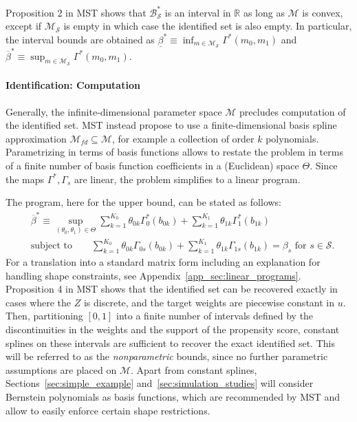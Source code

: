 \documentclass[12pt,a4paper,english]{article} %
\numberwithin{equation}{section}
\theoremstyle{definition}
\theoremstyle{remark}
\theoremstyle{plain}
\begin{document}
Proposition 2 in MST shows that $\mathcal{B}_\mathcal{S}^*$ is an interval in $\mathbb{R}$ as long as $\mathcal{M}$ is convex, except if $\mathcal{M}_\mathcal{S}$ is empty in which case the identified set is also empty.
In particular, the interval bounds are obtained as $\underline{\beta}^* \equiv \inf_{m\in\mathcal{M}_\mathcal{S}}\Gamma^*(m_0, m_1)$ and $\overline{\beta}^* \equiv \sup_{m\in\mathcal{M}_\mathcal{S}}\Gamma^*(m_0, m_1)$.


\paragraph{Identification: Computation}
Generally, the infinite-dimensional parameter space $\mathcal{M}$ precludes computation of the identified set.
MST instead propose to use a finite-dimensional basis spline approximation $\mathcal{M}_{fd}\subseteq{\mathcal{M}}$, for example a collection of order $k$ polynomials.
Parametrizing in terms of basis functions allows to restate the problem in terms of a finite number of basis function coefficients in a (Euclidean) space $\Theta$.
Since the maps $\Gamma^*, \Gamma_s$ are linear, the problem simplifies to a linear program.

The program, here for the upper bound, can be stated as follows:
\begin{align}\label{eq:lp_identification}
  &\overline{\beta}^* \equiv \sup_{(\theta_0, \theta_1)\in\Theta} \sum_{k=1}^{K_0}\theta_{0k}\Gamma^*_0(b_{0k}) + \sum_{k=1}^{K_1}\theta_{1k}\Gamma^*_1(b_{1k}) \\
  &\text{subject to} \qquad \sum_{k=1}^{K_0}\theta_{0k}\Gamma_{0s}(b_{0k}) + \sum_{k=1}^{K_1}\theta_{1k}\Gamma_{1s}(b_{1k}) = \beta_s \text{ for } s \in \mathcal{S}.
\end{align}
For a translation into a standard matrix form including an explanation for handling shape constraints, see Appendix~\ref{app_sec:linear_programs}.
Proposition 4 in MST shows that the identified set can be recovered exactly in cases where the $Z$ is discrete, and the target weights are piecewise constant in $u$.
Then, partitioning $[0,1]$ into a finite number of intervals defined by the discontinuities in the weights and the support of the propensity score, constant splines on these intervals are sufficient to recover the exact identified set.
This will be referred to as the \textit{nonparametric} bounds, since no further parametric assumptions are placed on $\mathcal{M}$.
Apart from constant splines, Sections~\ref{sec:simple_example} and~\ref{sec:simulation_studies} will consider Bernstein polynomials as basis functions, which are recommended by MST and allow to easily enforce certain shape restrictions.
\end{document}
